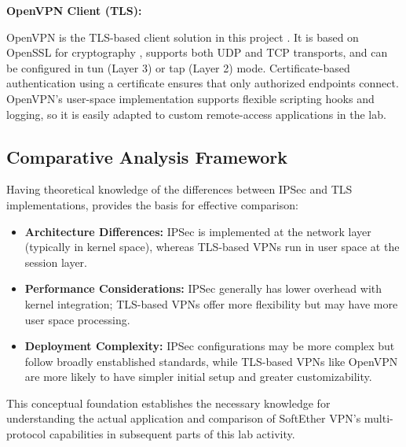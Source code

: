 \noindent
\textbf{OpenVPN Client (TLS):}

\noindent
OpenVPN is the TLS-based client solution in this project \cite{openvpn_official, openvpn_howto}. It is based on OpenSSL for cryptography \cite{openssl_project}, supports both UDP and TCP transports, and can be configured in tun (Layer 3) or tap (Layer 2) mode. Certificate-based authentication using a certificate ensures that only authorized endpoints connect. OpenVPN’s user-space implementation supports flexible scripting hooks and logging, so it is easily adapted to custom remote-access applications in the lab.

\subsection{Comparative Analysis Framework}

Having theoretical knowledge of the differences between IPSec and TLS implementations, provides the basis for effective comparison:

\begin{itemize}
    \item \textbf{Architecture Differences:} IPSec is implemented at the network layer (typically in kernel space), whereas TLS-based VPNs run in user space at the session layer.
    
    \item \textbf{Performance Considerations:} IPSec generally has lower overhead with kernel integration; TLS-based VPNs offer more flexibility but may have more user space processing.
    
    \item \textbf{Deployment Complexity:} IPSec configurations may be more complex but follow broadly enstablished standards, while TLS-based VPNs like OpenVPN are more likely to have simpler initial setup and greater customizability.
    
\end{itemize}


This conceptual foundation establishes the necessary knowledge for understanding the actual application and comparison of SoftEther VPN's multi-protocol capabilities in subsequent parts of this lab activity.